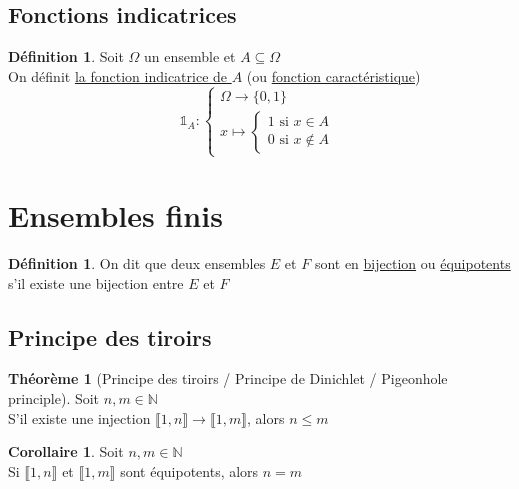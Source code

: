 \documentclass[10pt,a4paper]{article}
\theoremstyle{definition}
\newtheorem{theorem}[proposition]{Théorème}
\newtheorem{corollaire}[proposition]{Corollaire}
\newtheorem{definition}[proposition]{Définition}
\begin{document}
\subsection{Fonctions indicatrices}
\begin{definition}
Soit $\Omega$ un ensemble et $A \subseteq \Omega$ \\
On définit \uline{la fonction indicatrice de $A$} (ou \uline{fonction caractéristique})
\[ \mathds{1}_A: \begin{cases}
\Omega \to \{0, 1\} \\
x \mapsto \begin{cases}
1 \text{ si } x \in A \\
0 \text{ si } x \not\in A
\end{cases}
\end{cases} \]
\end{definition}

\section{Ensembles finis}
\begin{definition}
On dit que deux ensembles $E$ et $F$ sont en \uline{bijection} ou \uline{équipotents} s'il existe une bijection entre $E$ et $F$
\end{definition}

\subsection{Principe des tiroirs}
\begin{theorem}[Principe des tiroirs / Principe de Dinichlet / Pigeonhole principle]
Soit $n, m \in \mathbb{N}$ \\
S'il existe une injection $\llbracket 1, n \rrbracket \to \llbracket 1, m \rrbracket$, alors $n \leq m$
\end{theorem}
\begin{corollaire}
Soit $n, m \in \mathbb{N}$ \\
Si $\llbracket 1, n \rrbracket$ et $\llbracket 1, m \rrbracket$ sont équipotents, alors $n = m$
\end{corollaire}
\end{document}

